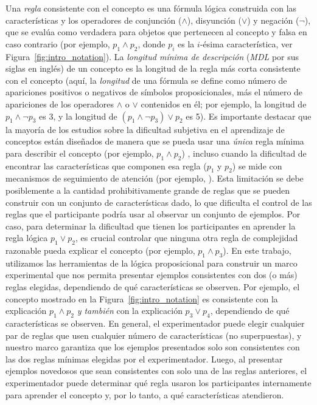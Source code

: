 Una \textit{regla} consistente con el concepto es una fórmula lógica construida con las características y los operadores de conjunción ($\land$), disyunción ($\lor$) y negación ($\lnot$), que se evalúa como verdadera para objetos que pertenecen al concepto y falsa en caso contrario (por ejemplo, $p_1 \land p_2$, donde $p_i$ es la $i$-ésima característica, ver Figura~\ref{fig:intro_notation}). La \textit{longitud mínima de descripción} (\textit{MDL} por sus siglas en inglés) de un concepto es la longitud de la regla más corta consistente con el concepto \cite{grunwald2007minimum} (aquí, la {\em longitud} de una fórmula se define como número de apariciones positivos o negativos de símbolos proposicionales, más el número de apariciones de los operadores $\land$ o $\lor$ contenidos en él; por ejemplo, la longitud de $p_1 \land \lnot p_3 $ es 3, y la longitud de $(p_1 \land \lnot p_3) \lor p_2$ es 5). Es importante destacar que la mayoría de los estudios sobre la dificultad subjetiva en el aprendizaje de conceptos están diseñados de manera que se pueda usar una {\em única} regla mínima para describir el concepto (por ejemplo, $p_1 \land p_2$) \cite{ashby2005human,feldman2000minimization}, incluso cuando la dificultad de encontrar las características que componen esa regla ($p_1$ y $p_2$) se mide con mecanismos de seguimiento de atención (por ejemplo, \cite {blair2009extremely, hoffman2010costs}). Esta limitación se debe posiblemente a la cantidad prohibitivamente grande de reglas que se pueden construir con un conjunto de características dado, lo que dificulta el control de las reglas que el participante podría usar al observar un conjunto de ejemplos. Por caso, para determinar la dificultad que tienen los participantes en aprender la regla lógica $p_1 \lor p_2$, es crucial controlar que ninguna otra regla de complejidad razonable pueda explicar el concepto (por ejemplo, $p_1 \land p_3$). En este trabajo, utilizamos las herramientas de la lógica proposicional para construir un marco experimental que nos permita presentar ejemplos consistentes con dos (o más) reglas elegidas, dependiendo de qué características se observen. Por ejemplo, el concepto mostrado en la Figura~\ref{fig:intro_notation} es consistente con la explicación $p_1 \land p_2$ \textit {y también} con la explicación $p_3 \lor p_4$, dependiendo de qué características se observen. En general, el experimentador puede elegir cualquier par de reglas que usen cualquier número de características (no superpuestas), y nuestro marco garantiza que los ejemplos presentados solo son consistentes con las dos reglas mínimas elegidas por el experimentador. Luego, al presentar ejemplos novedosos que sean consistentes con solo una de las reglas anteriores, el experimentador puede determinar qué regla usaron los participantes internamente para aprender el concepto y, por lo tanto, a qué características atendieron.


